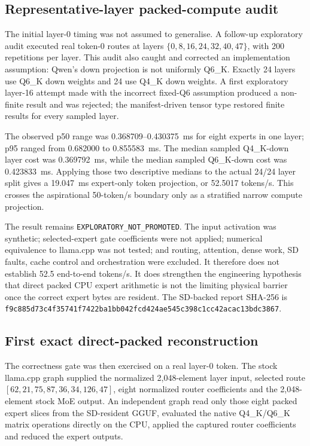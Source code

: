 \subsection{Representative-layer packed-compute audit}

The initial layer-0 timing was not assumed to generalise.  A follow-up
exploratory audit executed real token-0 routes at layers
$\{0,8,16,24,32,40,47\}$, with 200 repetitions per layer.  This audit also
caught and corrected an implementation assumption: Qwen's down projection is
not uniformly Q6\_K.  Exactly 24 layers use Q6\_K down weights and 24 use Q4\_K
down weights.  A first exploratory layer-16 attempt made with the incorrect
fixed-Q6 assumption produced a non-finite result and was rejected; the
manifest-driven tensor type restored finite results for every sampled layer.

The observed p50 range was 0.368709--0.430375~ms for eight experts in one
layer; p95 ranged from 0.682000 to 0.855583~ms.  The median sampled Q4\_K-down
layer cost was 0.369792~ms, while the median sampled Q6\_K-down cost was
0.423833~ms.  Applying those two descriptive medians to the actual 24/24 layer
split gives a 19.047~ms expert-only token projection, or 52.5017 tokens/s.
This crosses the aspirational 50-token/s boundary only as a stratified narrow
compute projection.

The result remains \texttt{EXPLORATORY\_NOT\_PROMOTED}.  The input activation
was synthetic; selected-expert gate coefficients were not applied; numerical
equivalence to llama.cpp was not tested; and routing, attention, dense work,
SD faults, cache control and orchestration were excluded.  It therefore does
not establish 52.5 end-to-end tokens/s.  It does strengthen the engineering
hypothesis that direct packed CPU expert arithmetic is not the limiting
physical barrier once the correct expert bytes are resident.  The SD-backed
report SHA-256 is
\texttt{f9c885d73c4f35741f7422ba1bb042fcd424ae545c398c1cc42acac13bdc3867}.

\subsection{First exact direct-packed reconstruction}

The correctness gate was then exercised on a real layer-0 token.  The stock
llama.cpp graph supplied the normalized 2{,}048-element layer input, selected
route $[62,21,75,87,36,34,126,47]$, eight normalized router coefficients and
the 2{,}048-element stock MoE output.  An independent graph read only those
eight packed expert slices from the SD-resident GGUF, evaluated the native
Q4\_K/Q6\_K matrix operations directly on the CPU, applied the captured router
coefficients and reduced the expert outputs.

